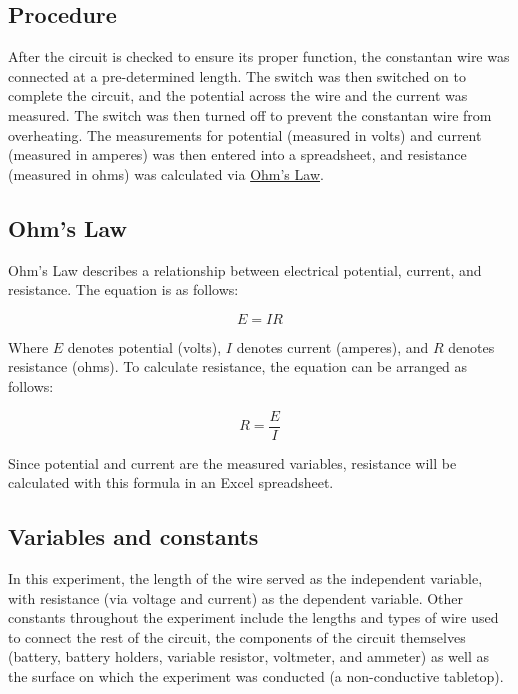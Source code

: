 \documentclass{article}
\begin{document}
\subsection{Procedure}

After the circuit is checked to ensure its proper function, the constantan wire was connected at a pre-determined length. The switch was then switched on to complete the circuit, and the potential across the wire and the current was measured. The switch was then turned off to prevent the constantan wire from overheating. The measurements for potential (measured in volts) and current (measured in amperes) was then entered into a spreadsheet, and resistance (measured in ohms) was calculated via \hyperref[sec:ohm]{Ohm’s Law}.

\subsection{Ohm's Law}
\label{sec:ohm}

Ohm’s Law describes a relationship between electrical potential, current, and resistance. The equation is as follows:

\begin{equation}
    E=IR
\end{equation}

Where \begin{math}E\end{math} denotes potential (volts), \begin{math}I\end{math} denotes current (amperes), and \begin{math}R\end{math} denotes resistance (ohms). To calculate resistance, the equation can be arranged as follows:

\begin{equation}
    R=\frac{E}{I}
\end{equation}

Since potential and current are the measured variables, resistance will be calculated with this formula in an Excel spreadsheet.

\subsection{Variables and constants}

In this experiment, the length of the wire served as the independent variable, with resistance (via voltage and current) as the dependent variable. Other constants throughout the experiment include the lengths and types of wire used to connect the rest of the circuit, the components of the circuit themselves (battery, battery holders, variable resistor, voltmeter, and ammeter) as well as the surface on which the experiment was conducted (a non-conductive tabletop).
\end{document}
